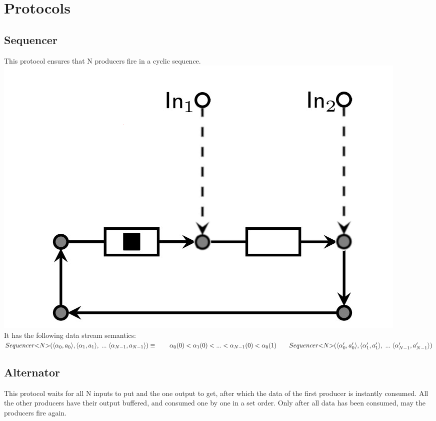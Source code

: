 \section{Protocols}
\subsection{Sequencer}
This protocol ensures that N producers fire in a cyclic sequence.\\

\includegraphics[]{img/seq.png}\\
%
It has the following data stream semantics:\\
%
$
Sequencer{<}N{>}(\langle \alpha_0, a_0 \rangle, \langle \alpha_1, a_1 \rangle,\;...\; \langle \alpha_{N-1}, a_{N-1} \rangle) \equiv \\
\hphantom \qquad  \alpha_0(0) < \alpha_1(0) < ... < \alpha_{N-1}(0) < \alpha_0(1) \\
\hphantom \qquad Sequencer{<}N{>}(\langle \alpha_0', a_0' \rangle, \langle \alpha_1', a_1' \rangle,\;...\; \langle \alpha_{N-1}', a_{N-1}' \rangle)
$


\subsection{Alternator}
This protocol waits for all N inputs to put and the one output to get, after which the data of the first producer is instantly consumed.
All the other producers have their output buffered, and consumed one by one in a set order.
Only after all data has been consumed, may the producers fire again.\\

